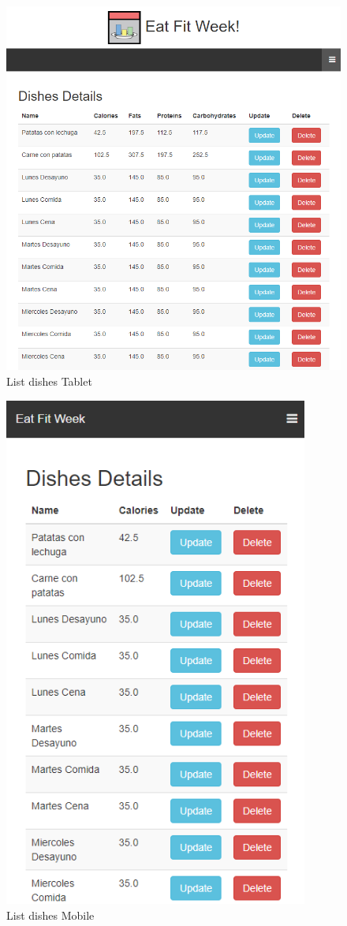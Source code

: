 \documentclass[12pt, a4paper, twoside]{book}
\begin{document}
	\begin{figure}[H]
		\centering
		\includegraphics[width=15cm]{Imagenes/MU-ListDishesTablet.png}
		\caption{List dishes Tablet}\label{List dishes Tablet}
	\end{figure}
	\begin{figure}[H]
		\centering
		\includegraphics[width=10cm]{Imagenes/MU-ListDishesMobile.png}
		\caption{List dishes Mobile}\label{List dishes Mobile}
	\end{figure}
\end{document}
